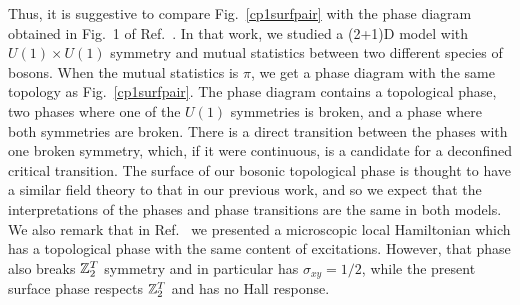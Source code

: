 Thus, it is suggestive to compare Fig.~\ref{cp1surfpair} with the phase diagram obtained in Fig.~1 of Ref.~\cite{Loopy}. In that work, we studied a (2+1)D model with $U(1)\times U(1)$ symmetry and mutual statistics between two different species of bosons. When the mutual statistics is $\pi$, we get a phase diagram with the same topology as Fig.~\ref{cp1surfpair}. The phase diagram contains a topological phase, two phases where one of the $U(1)$ symmetries is broken, and a phase where both symmetries are broken. There is a direct transition between the phases with one broken symmetry, which, if it were continuous, is a candidate for a deconfined critical transition.\cite{Gen2Loops} The surface of our bosonic topological phase is thought to have a similar field theory to that in our previous work,\cite{Loopy,Gen2Loops} and so we expect that the interpretations of the phases and phase transitions are the same in both models. We also remark that in Ref.~\cite{FQHE} we presented a microscopic local Hamiltonian which has a topological phase with the same content of excitations. However, that phase also breaks $\mathbb{Z}_2^T$ symmetry and in particular has $\sigma_{xy}=1/2$, while the present surface phase respects $\mathbb{Z}_2^T$ and has no Hall response.




